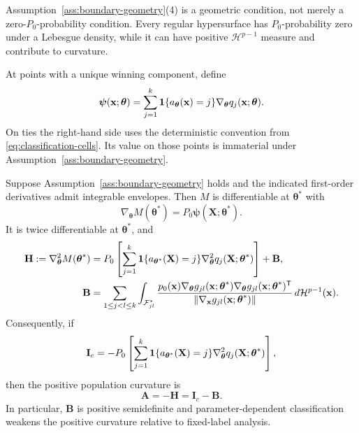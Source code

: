 Assumption~\ref{ass:boundary-geometry}(4) is a geometric condition, not merely
a zero-$P_0$-probability condition.  Every regular hypersurface has
$P_0$-probability zero under a Lebesgue density, while it can have positive
$\mathcal H^{p-1}$ measure and contribute to curvature.

At points with a unique winning component, define
\begin{equation}
 \boldsymbol{\psi}(\mathbf{x};\boldsymbol{\theta})
 =\sum_{j=1}^k
 \mathbf 1\{a_{\boldsymbol{\theta}}(\mathbf{x})=j\}\nabla_{\boldsymbol{\theta}}q_j(\mathbf{x};\boldsymbol{\theta}).
 \label{eq:classification-score}
\end{equation}
On ties the right-hand side uses the deterministic convention from
\eqref{eq:classification-cells}.  Its value on those points is immaterial under
Assumption~\ref{ass:boundary-geometry}.

\begin{theorem}
\label{thm:population-curvature}
Suppose Assumption~\ref{ass:boundary-geometry} holds and the indicated
first-order derivatives admit integrable envelopes.  Then $M$ is differentiable
at $\boldsymbol{\theta}^*$ with
\begin{equation}
 \nabla_{\boldsymbol{\theta}}M(\boldsymbol{\theta}^*)=P_0\boldsymbol{\psi}(\mathbf{X};\boldsymbol{\theta}^*).
 \label{eq:population-gradient}
\end{equation}
It is twice differentiable at $\boldsymbol{\theta}^*$, and
\begin{align}
 \mathbf{H}:=\nabla_{\boldsymbol{\theta}}^2M(\boldsymbol{\theta}^*)
 &=P_0\left[
   \sum_{j=1}^k\mathbf 1\{a_{\boldsymbol{\theta}^*}(\mathbf{X})=j\}
   \nabla_{\boldsymbol{\theta}}^2q_j(\mathbf{X};\boldsymbol{\theta}^*)
  \right]+\mathbf{B},                                      \label{eq:hessian-decomposition}\\
 \mathbf{B}
 &=\sum_{1\leq j<l\leq k}
   \int_{\mathcal F_{jl}^*}
   \frac{p_0(\mathbf{x})\nabla_{\boldsymbol{\theta}}g_{jl}(\mathbf{x};\boldsymbol{\theta}^*)
        \nabla_{\boldsymbol{\theta}}g_{jl}(\mathbf{x};\boldsymbol{\theta}^*)^\mathsf T}
        {\|\nabla_{\mathbf{x}}g_{jl}(\mathbf{x};\boldsymbol{\theta}^*)\|}
   \,d\mathcal H^{p-1}(\mathbf{x}).                                \label{eq:boundary-curvature}
\end{align}
Consequently, if
\begin{equation}
 \mathbf{I}_c=-P_0\left[
   \sum_{j=1}^k\mathbf 1\{a_{\boldsymbol{\theta}^*}(\mathbf{X})=j\}
   \nabla_{\boldsymbol{\theta}}^2q_j(\mathbf{X};\boldsymbol{\theta}^*)
  \right],
 \label{eq:fixed-class-information}
\end{equation}
then the positive population curvature is
\begin{equation}
 \mathbf{A}=-\mathbf{H}=\mathbf{I}_c-\mathbf{B}.
 \label{eq:positive-curvature}
\end{equation}
In particular, $\mathbf{B}$ is positive semidefinite and parameter-dependent
classification weakens the positive curvature relative to fixed-label
analysis.
\end{theorem}

